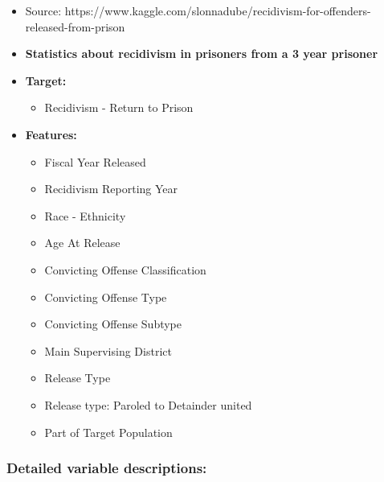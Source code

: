 \documentclass[11pt]{article}
\providecommand{\tightlist}{%
      \setlength{\itemsep}{0pt}\setlength{\parskip}{0pt}}
\begin{document}
\begin{itemize}
\tightlist
\item
  Source:
  https://www.kaggle.com/slonnadube/recidivism-for-offenders-released-from-prison
\item
  \textbf{Statistics about recidivism in prisoners from a 3 year
  prisoner}
\item
  \textbf{Target:}

  \begin{itemize}
  \tightlist
  \item
    Recidivism - Return to Prison
  \end{itemize}
\item
  \textbf{Features:}

  \begin{itemize}
  \tightlist
  \item
    Fiscal Year Released
  \item
    Recidivism Reporting Year
  \item
    Race - Ethnicity
  \item
    Age At Release
  \item
    Convicting Offense Classification
  \item
    Convicting Offense Type
  \item
    Convicting Offense Subtype
  \item
    Main Supervising District
  \item
    Release Type
  \item
    Release type: Paroled to Detainder united
  \item
    Part of Target Population
  \end{itemize}
\end{itemize}

    

    \hypertarget{detailed-variable-descriptions}{%
\subsubsection{Detailed variable
descriptions:}\label{detailed-variable-descriptions}}
\end{document}
